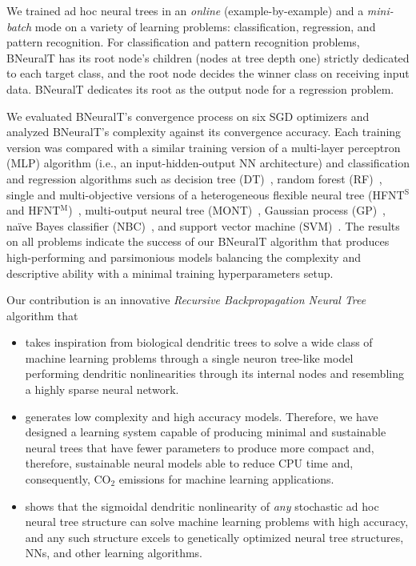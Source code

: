 \documentclass[11pt,a4paper]{article}
\begin{document}
    We trained ad hoc neural trees in an \textit{online} (example-by-example) and a \textit{mini-batch} mode on a variety of learning problems:  classification, regression, and pattern recognition. For classification and pattern recognition problems, BNeuralT has its root node's children (nodes at tree depth one) strictly dedicated to each target class, and the root node decides the winner class on receiving input data. BNeuralT dedicates its root as the output node for a regression problem.
    
    We evaluated BNeuralT's convergence process on six SGD optimizers and analyzed BNeuralT's complexity against its convergence accuracy. Each training version was compared with a similar training version of a multi-layer perceptron (MLP) algorithm (i.e., an input-hidden-output NN architecture) and classification and regression algorithms such as decision tree (DT)~\citep{breiman1984classification}, random forest (RF)~\citep{breiman2001random}, single and multi-objective versions of a heterogeneous flexible neural tree (HFNT$^{\text{S}}$ and HFNT$^{\text{M}}$)~\citep{ojha2017ensemble}, multi-output neural tree (MONT)~\citep{ojha2020multi},  
    Gaussian process (GP)~\citep{rasmussen2006gaussian}, na\"ive Bayes classifier (NBC)~\citep{mitchell1997machine}, and support vector machine (SVM)~\citep{cortes1995support,chang2011libsvm,fan2008liblinear}. 
The results on all problems indicate the success of our BNeuralT algorithm that produces high-performing and parsimonious models balancing the complexity and descriptive ability with a minimal training hyperparameters setup. 

    Our contribution is an innovative \textit{Recursive Backpropagation Neural Tree} algorithm that
    \begin{itemize}
    	\item takes inspiration from biological dendritic trees to solve a wide class of machine learning problems through  a single  neuron tree-like model performing dendritic nonlinearities through its internal nodes and resembling a highly sparse neural network. 
    	
    	\item generates low complexity and high accuracy models. Therefore, we have designed a learning system capable of producing minimal and sustainable neural trees that have fewer parameters to produce more compact and, therefore, sustainable neural models able to reduce CPU time and, consequently, CO$_2$ emissions for machine learning applications.
    	
    	\item shows that the sigmoidal dendritic nonlinearity of \textit{any} stochastic ad hoc neural tree structure can solve machine learning problems with high accuracy, and any such structure excels to genetically optimized neural tree structures, NNs, and other learning algorithms.
    \end{itemize}
\end{document}
